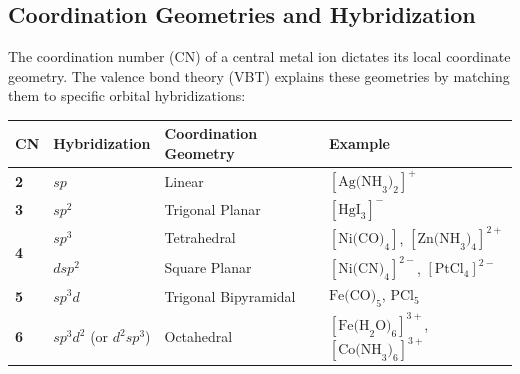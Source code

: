 \documentclass[12pt,a4paper]{article}
\begin{document}
\subsection{Coordination Geometries and Hybridization}
The coordination number (CN) of a central metal ion dictates its local coordinate geometry. The valence bond theory (VBT) explains these geometries by matching them to specific orbital hybridizations:

\par\vspace{4pt}\noindent
\begin{tabularx}{\linewidth}{|B{2.2cm}|B{3.2cm}|Y|B{4.5cm}|}
\hline
\textbf{CN} & \textbf{Hybridization} & \textbf{Coordination Geometry} & \textbf{Example} \\
\hline
\textbf{2} & $sp$ & Linear & $[\text{Ag(NH}_3)_2]^+$ \\
\hline
\textbf{3} & $sp^2$ & Trigonal Planar & $[\text{HgI}_3]^-$ \\
\hline
{} & $sp^3$ & Tetrahedral & $[\text{Ni(CO)}_4]$, $[\text{Zn(NH}_3)_4]^{2+}$ \\
 & $dsp^2$ & Square Planar & $[\text{Ni(CN)}_4]^{2-}$, $[\text{PtCl}_4]^{2-}$ \\
\hline
\textbf{5} & $sp^3d$ & Trigonal Bipyramidal & $\text{Fe(CO)}_5$, $\text{PCl}_5$ \\
\hline
\textbf{6} & $sp^3d^2$ (or $d^2sp^3$) & Octahedral & $[\text{Fe(H}_2\text{O)}_6]^{3+}$, $[\text{Co(NH}_3)_6]^{3+}$ \\
\hline
\end{tabularx}
\vspace{6pt}
\end{document}
